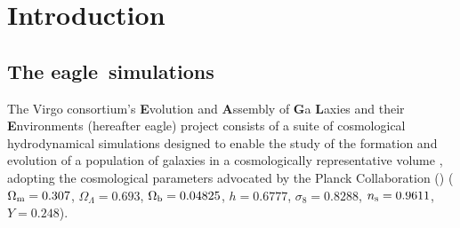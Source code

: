 \documentclass[10pt, a4paper]{article}
\newcommand{\eagle}{{\sc eagle}}
\newcommand{\virgo}{{\sc virgo}}
\begin{document}
\maketitle

\begin{abstract}
This manual accompanies the release of the particle data for 24 simulations of
the \eagle\ suite of cosmological hydrodynamical simulations of galaxy
formation by the \virgo\ consortium. It describes how to download these
snapshots and how to extract datasets from them, emphasising the meaning of
variables, and their units. We provide examples for extracting the particle
data in {\sc python}. This data release complements our earlier release of
numerous integrated properties of the galaxies in \eagle\ through an {\sc sql}
relational database. This database has been updated to include the additional
simulations that are part of the present data release. Scientists wanting to
use \eagle\ may find it useful to first investigate whether their analysis can
be performed using the database, before accessing the particle data.  The
particles in the snapshot files are indexed by a peano-hilbert key. This allows
for an eased extraction of simply connected spatial volumes, without needing to
read the entire snapshot. This makes it possible to analyse many aspects of
galaxies using modest computing resources, even when using \eagle\ simulations
with large numbers of particles. A reading routine is provided to simplify this
process.
\end{abstract}

\section{Introduction}
\subsection{The \eagle\ simulations}
The Virgo consortium's {\bf E}volution and {\bf A}ssembly of {\bf G}a{\bf
L}axies and their {\bf E}nvironments (hereafter {\sc eagle}) project consists
of a suite of cosmological hydrodynamical simulations designed to enable the
study of the formation and evolution of a population of galaxies in a
cosmologically representative volume \cite{schaye2015,crain2015}, adopting the
cosmological parameters advocated by the Planck Collaboration (\cite{Planck13})
($\Omega_{\rm m} = 0.307$, $\Omega_\Lambda = 0.693$, $\Omega_{\rm b} =
0.04825$, $h = 0.6777$, $\sigma_8 = 0.8288$, $n_{\rm s} = 0.9611$, $Y=0.248$). 
	
\end{document}
